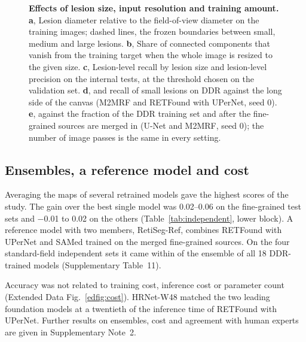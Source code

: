 \begin{figure}[p]
\centering
{}
\caption{\textbf{Effects of lesion size, input resolution and training amount.} \textbf{a}, Lesion diameter relative to the field-of-view diameter on the training images; dashed lines, the frozen boundaries between small, medium and large lesions. \textbf{b}, Share of connected components that vanish from the training target when the whole image is resized to the given size. \textbf{c}, Lesion-level recall by lesion size and lesion-level precision on the internal tests, at the threshold chosen on the validation set. \textbf{d}, \mAUPR{} and recall of small lesions on DDR against the long side of the canvas (M2MRF and RETFound with UPerNet, seed 0). \textbf{e}, \mAUPR{} against the fraction of the DDR training set and after the fine-grained sources are merged in (U-Net and M2MRF, seed 0); the number of image passes is the same in every setting.}
\label{fig:scale}
\end{figure}



\subsection{Ensembles, a reference model and cost}
Averaging the maps of several retrained models gave the highest scores of the study. The gain over the best single model was 0.02--0.06 \mAUPR{} on the fine-grained test sets and $-$0.01 to 0.02 on the others (Table~\ref{tab:independent}, lower block). A reference model with two members, RetiSeg-Ref, combines RETFound with UPerNet and SAMed trained on the merged fine-grained sources. On the four standard-field independent sets it came within  of the ensemble of all 18 DDR-trained models (Supplementary Table~11).

Accuracy was not related to training cost, inference cost or parameter count (Extended Data Fig.~\ref{edfig:cost}). HRNet-W48 matched the two leading foundation models at a twentieth of the inference time of RETFound with UPerNet. Further results on ensembles, cost and agreement with human experts are given in Supplementary Note~2.

\FloatBarrier
